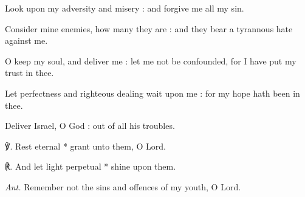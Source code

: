 Look upon my adversity and misery : and forgive me all my sin.\par
{}Consider mine enemies, how many they are : and they bear a tyrannous hate against me.\par
{}O keep my soul, and deliver me : let me not be confounded, for I have put my trust in thee.\par
{}Let perfectness and righteous dealing wait upon me : for my hope hath been in thee.\par
{}Deliver Israel, O God : out of all his troubles.\par
℣. Rest eternal * grant unto them, O Lord.\par
℟. And let light perpetual * shine upon them.\par\noindent
\textit{Ant.} Remember not the sins and offences of my youth, O Lord.

